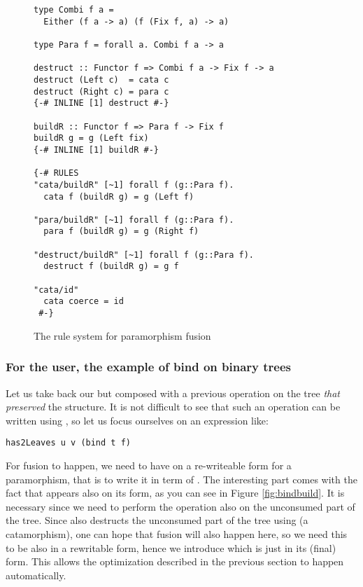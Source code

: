 \begin{figure}
\begin{verbatim}
type Combi f a =
  Either (f a -> a) (f (Fix f, a) -> a)

type Para f = forall a. Combi f a -> a

destruct :: Functor f => Combi f a -> Fix f -> a
destruct (Left c)  = cata c
destruct (Right c) = para c
{-# INLINE [1] destruct #-}

buildR :: Functor f => Para f -> Fix f
buildR g = g (Left fix)
{-# INLINE [1] buildR #-}

{-# RULES
"cata/buildR" [~1] forall f (g::Para f).
  cata f (buildR g) = g (Left f)

"para/buildR" [~1] forall f (g::Para f).
  para f (buildR g) = g (Right f)

"destruct/buildR" [~1] forall f (g::Para f).
  destruct f (buildR g) = g f

"cata/id"
  cata coerce = id
 #-}
\end{verbatim}
\caption{The rule system for paramorphism fusion}
\label{fig:para}
\end{figure}

\subsubsection{For the user, the example of bind on binary trees}
Let us take back our   but composed with a previous operation on the tree \emph{that preserved} the structure. It is not difficult to see that such an operation can be written using , so let us focus ourselves on an expression like:

\begin{verbatim}
has2Leaves u v (bind t f)
\end{verbatim}

\noindent For fusion to happen, we need to have  on a re-writeable form for a paramorphism, that is to write it in term of . The interesting part comes with the fact that  appears also on its  form, as you can see in Figure \ref{fig:bindbuild}. It is necessary since we need to perform the  operation also on the unconsumed part of the tree. Since  also destructs the unconsumed part of the tree using  (a catamorphism), one can hope that fusion will also happen here, so we need this  to be also in a rewritable form, hence we introduce  which is just  in its (final)  form. This allows the  optimization described in the previous section to happen automatically.

